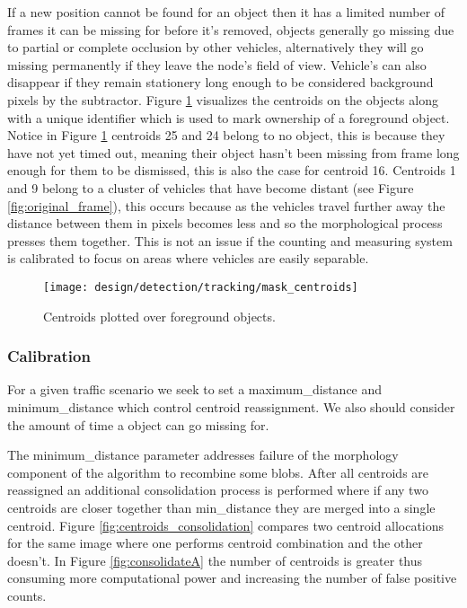 If a new position cannot be found for an object then it has a limited number of frames it can be missing for before it's removed, objects generally go missing due to partial or complete occlusion by other vehicles, alternatively they will go missing permanently if they leave the node's field of view. Vehicle's can also disappear if they remain stationery long enough to be considered background pixels by the subtractor. Figure \ref{fig:centroids} visualizes the centroids on the objects along with a unique identifier which is used to mark ownership of a foreground object. Notice in Figure \ref{fig:centroids} centroids 25 and 24 belong to no object, this is because they have not yet timed out, meaning their object hasn't been missing from frame long enough for them to be dismissed, this is also the case for centroid 16. Centroids 1 and 9 belong to a cluster of vehicles that have become distant (see Figure \ref{fig:original_frame}), this occurs because as the vehicles travel further away the distance between them in pixels becomes less and so the morphological process presses them together. This is not an issue if the counting and measuring system is calibrated to focus on areas where vehicles are easily separable. 

\begin{figure}[H]
    \centering
    \centering\texttt{[image: design/detection/tracking/mask\_centroids]}
    \caption{Centroids plotted over foreground objects.}
    \label{fig:centroids}
\end{figure}

\subsubsection{Calibration}

For a given traffic scenario we seek to set a maximum\_distance and minimum\_distance which control centroid reassignment. We also should consider the amount of time a object can go missing for. 

The minimum\_distance parameter addresses failure of the morphology component of the algorithm to recombine some blobs. After all centroids are reassigned an additional consolidation process is performed where if any two centroids are closer together than min\_distance they are merged into a single centroid. Figure \ref{fig:centroids_consolidation} compares two centroid allocations for the same image where one performs centroid combination and the other doesn't. In Figure \ref{fig:consolidateA} the number of centroids is greater thus consuming more computational power and increasing the number of false positive counts.

